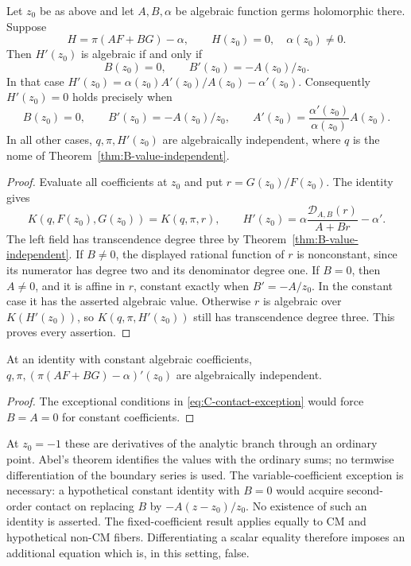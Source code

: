 \begin{proposition}
\label{prop:C-varying-transverse}
Let $z_0$ be as above and let $A,B,\alpha$ be algebraic function germs
holomorphic there. Suppose
\[
 H=\pi(AF+BG)-\alpha,\qquad H(z_0)=0,\quad\alpha(z_0)\ne0.
\]
Then $H'(z_0)$ is algebraic if and only if
\[
                       B(z_0)=0,\qquad B'(z_0)=-A(z_0)/z_0.
\]
In that case
$H'(z_0)=\alpha(z_0)A'(z_0)/A(z_0)-\alpha'(z_0)$.
Consequently $H'(z_0)=0$ holds precisely when
\begin{equation}\label{eq:C-contact-exception}
 B(z_0)=0,\qquad B'(z_0)=-A(z_0)/z_0,\qquad
 A'(z_0)=\frac{\alpha'(z_0)}{\alpha(z_0)}A(z_0).
\end{equation}
In all other cases, $q,\pi,H'(z_0)$ are algebraically independent,
where $q$ is the nome of Theorem~\ref{thm:B-value-independent}.
\end{proposition}
\begin{proof}
Evaluate all coefficients at $z_0$ and put $r=G(z_0)/F(z_0)$.
The identity gives
\[
 K(q,F(z_0),G(z_0))=K(q,\pi,r),\qquad
 H'(z_0)=\alpha\frac{\mathcal D_{A,B}(r)}{A+Br}-\alpha'.
\]
The left field has transcendence degree three by
Theorem~\ref{thm:B-value-independent}. If $B\ne0$, the displayed
rational function of $r$ is nonconstant, since its numerator has degree
two and its denominator degree one. If $B=0$, then $A\ne0$, and it
is affine in $r$, constant exactly when $B'=-A/z_0$. In the constant
case it has the asserted algebraic value. Otherwise $r$ is algebraic
over $K(H'(z_0))$, so $K(q,\pi,H'(z_0))$ still has transcendence
degree three. This proves every assertion.
\end{proof}

\begin{corollary}\label{cor:C-derivative-independent}
At an identity with constant algebraic coefficients,
$q,\pi,(\pi(AF+BG)-\alpha)'(z_0)$ are algebraically independent.
\end{corollary}
\begin{proof}
The exceptional conditions in \eqref{eq:C-contact-exception} would
force $B=A=0$ for constant coefficients.
\end{proof}

At $z_0=-1$ these are derivatives of the analytic branch through an
ordinary point. Abel's theorem identifies the values with the ordinary
sums; no termwise differentiation of the boundary series is used.
The variable-coefficient exception is necessary: a hypothetical constant
identity with $B=0$ would acquire second-order contact on replacing
$B$ by $-A(z-z_0)/z_0$. No existence of such an identity is asserted.
The fixed-coefficient result applies equally to CM and hypothetical
non-CM fibers. Differentiating a scalar equality therefore imposes an
additional equation which is, in this setting, false.


